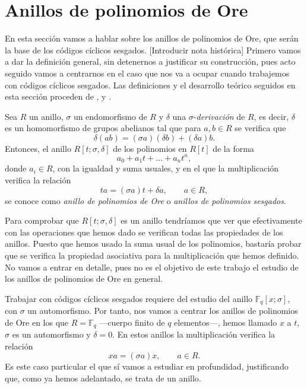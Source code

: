 \chapter{Anillos de polinomios de Ore}

En esta sección vamos a hablar sobre los anillos de polinomios de Ore, que serán la base de los códigos cíclicos sesgados.
[Introducir nota histórica]
Primero vamos a dar la definición general, sin detenernos a justificar su construcción, pues acto seguido vamos a centrarnos en el caso que nos va a ocupar cuando trabajemos con códigos cíclicos sesgados.
Las definiciones y el desarrollo teórico seguidos en esta sección proceden de \parencite{jacobson_finite-dimensional_1996}, \parencite{ore_theory_1933} y \parencite{gomez-torrecillas_factoring_2020}.

\begin{definition}
  Sea \(R\) un anillo, \(\sigma\) un endomorfismo de \(R\) y \(\delta\) una \(\sigma\)-\textit{derivación} de \(R\), es decir, \(\delta\) es un homomorfismo de grupos abelianos tal que para \(a, b \in R\) se verifica que
  \[
    \delta(ab) = (\sigma a)(\delta b) + (\delta a)b.
  \]
  Entonces, el anillo \(R[t; \sigma, \delta]\) de los polinomios en \(R[t]\) de la forma
  \[
    a_0 + a_1t + \dots + a_nt^n,
  \]
  donde \(a_i \in R\), con la igualdad y suma usuales, y en el que la multiplicación verifica la relación 
  \[
  ta = (\sigma a)t + \delta a, \qquad a \in R,
  \]
  se conoce como \textit{anillo de polinomios de Ore} o \textit{anillos de polinomios sesgados}.
\end{definition}

Para comprobar que \(R[t; \sigma, \delta]\) es un anillo tendríamos que ver que efectivamente con las operaciones que hemos dado se verifican todas las propiedades de los anillos.
Puesto que hemos usado la suma usual de los polinomios, bastaría probar que se verifica la propiedad asociativa para la multiplicación que hemos definido.
No vamos a entrar en detalle, pues no es el objetivo de este trabajo el estudio de los anillos de polinomios de Ore en general.

Trabajar con códigos cíclicos sesgados requiere del estudio del anillo \(\mathbb F_q[x; \sigma]\), con \(\sigma\) un automorfismo.
Por tanto, nos vamos a centrar los anillos de polinomios de Ore en los que \(R = \mathbb F_q\) —cuerpo finito de \(q\) elementos—, hemos llamado \(x\) a \(t\), \(\sigma\) es un automorfismo y \(\delta = 0\).
En estos anillos la multiplicación verifica la relación 
\[
  xa = (\sigma a)x, \qquad a \in R.
\]
Es este caso particular el que sí vamos a estudiar en profundidad, justificando que, como ya hemos adelantado, se trata de un anillo.

